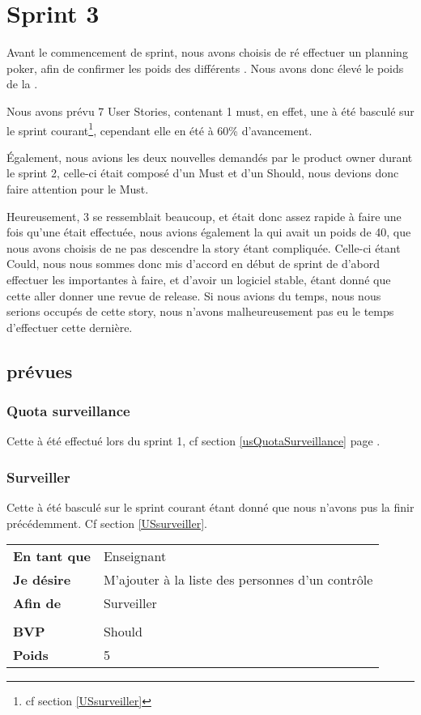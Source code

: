 \chapter{Sprint 3}
Avant le commencement de sprint, nous avons choisis de ré effectuer un planning poker,
afin de confirmer les poids des différents \USs{}. Nous avons donc élevé le poids 
de la .

Nous avons prévu 7 User Stories, contenant 1 must, en effet, une \US à été basculé sur le sprint
courant\footnote{cf section \ref{USsurveiller} \pageref{USsurveiller}}, cependant elle en été à 60\%
d'avancement. 

Également, nous avions les deux nouvelles \USs{} demandés par le product owner durant le sprint 2, 
celle-ci était composé d'un Must et d'un Should, nous devions donc faire attention pour le Must.

Heureusement, 3 \US{} se ressemblait beaucoup, et était donc assez rapide à faire une fois
qu'une \US{} était effectuée, nous avions également la  qui
avait un poids de 40, que nous avons choisis de ne pas descendre la story étant compliquée.
Celle-ci étant Could, nous nous sommes donc mis d'accord en début de sprint de d'abord effectuer les
\USs{} importantes à faire, et d'avoir un logiciel stable, étant donné que cette \USs{} aller donner
une revue de release. Si nous avions du temps, nous nous serions occupés de cette story, nous n'avons
malheureusement pas eu le temps d'effectuer cette dernière.

\section{\USs{} prévues}
\subsection{Quota surveillance}		
Cette \US{} à été effectué lors du sprint 1, cf section \ref{usQuotaSurveillance} page
\pageref{usQuotaSurveillance}.

\subsection{Surveiller}
Cette \US à été basculé sur le sprint courant étant donné que nous n'avons pus la finir précédemment. Cf
section \ref{USsurveiller}.

\begin{tabular}{ll}
	\textbf{En tant que}	&	Enseignant \\
	\textbf{Je désire}&	M'ajouter à la liste des personnes d'un contrôle\\
	\textbf{Afin de}	& Surveiller\\
	&\\
	\textbf{BVP} & Should\\
	\textbf{Poids} & 5\\
\end{tabular}

